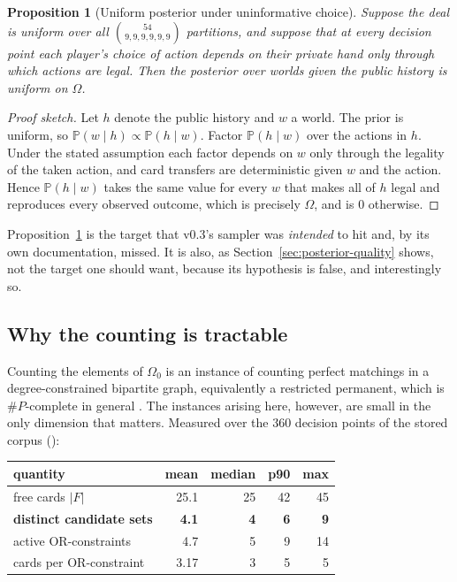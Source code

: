 \documentclass[11pt,letterpaper]{article}
\newtheorem{proposition}{Proposition}
\newcommand{\Prob}{\ensuremath{\mathbb{P}}}
\begin{document}
\begin{proposition}[Uniform posterior under uninformative choice]
\label{prop:uniform}
Suppose the deal is uniform over all $\binom{54}{9,9,9,9,9,9}$ partitions, and
suppose that at every decision point each player's choice of action depends on
their private hand only through which actions are legal. Then the posterior
over worlds given the public history is uniform on $\Omega$.
\end{proposition}

\begin{proof}[Proof sketch]
Let $h$ denote the public history and $w$ a world. The prior is uniform, so
$\Prob(w \mid h) \propto \Prob(h \mid w)$. Factor $\Prob(h \mid w)$ over the
actions in $h$. Under the stated assumption each factor depends on $w$ only
through the legality of the taken action, and card transfers are deterministic
given $w$ and the action. Hence $\Prob(h \mid w)$ takes the same value for
every $w$ that makes all of $h$ legal and reproduces every observed outcome,
which is precisely $\Omega$, and is $0$ otherwise.
\end{proof}

Proposition~\ref{prop:uniform} is the target that v0.3's sampler was
\emph{intended} to hit and, by its own documentation, missed. It is also, as
Section~\ref{sec:posterior-quality} shows, not the target one should want,
because its hypothesis is false, and interestingly so.

\subsection{Why the counting is tractable}

Counting the elements of $\Omega_0$ is an instance of counting perfect
matchings in a degree-constrained bipartite graph, equivalently a restricted
permanent, which is $\#P$-complete in general \citep{valiant1979complexity}.
The instances arising here, however, are small in the only dimension that
matters. Measured over the $360$ decision points of the stored corpus
():

\begin{center}
\begin{tabular}{lrrrr}
\toprule
quantity & mean & median & p90 & max\\
\midrule
free cards $|F|$                 & 25.1 & 25 & 42 & 45\\
\textbf{distinct candidate sets} & \textbf{4.1} & \textbf{4} & \textbf{6} & \textbf{9}\\
active OR-constraints            & 4.7 & 5 & 9 & 14\\
cards per OR-constraint          & 3.17 & 3 & 5 & 5\\
\bottomrule
\end{tabular}
\end{center}
\end{document}
